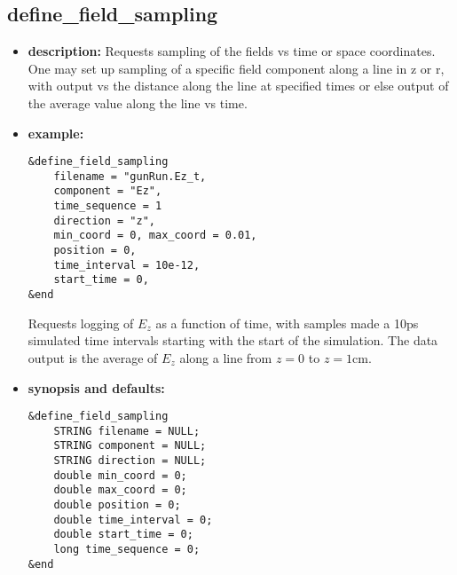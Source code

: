%
\newpage

\subsection{define\_field\_sampling}

\begin{itemize}

\item {\bf description:}
Requests sampling of the fields vs time or space coordinates.  One may
set up sampling of a specific field component along a line in z or r,
with output vs the distance along the line at specified times or else
output of the average value along the line vs time.

\item {\bf example:} 
\begin{verbatim}
&define_field_sampling
    filename = "gunRun.Ez_t,
    component = "Ez",
    time_sequence = 1
    direction = "z",
    min_coord = 0, max_coord = 0.01,
    position = 0,
    time_interval = 10e-12,
    start_time = 0,
&end
\end{verbatim}
Requests logging of $E_z$ as a function of time, with samples made a
10ps simulated time intervals starting with the start of the
simulation.  The data output is the average of $E_z$ along a
line from $z=0$ to $z=1$cm.

\item {\bf synopsis and defaults:} 
\begin{verbatim}
&define_field_sampling
    STRING filename = NULL;
    STRING component = NULL;
    STRING direction = NULL;
    double min_coord = 0;
    double max_coord = 0;
    double position = 0;
    double time_interval = 0;
    double start_time = 0;
    long time_sequence = 0;
&end
\end{verbatim}


\end{itemize}
